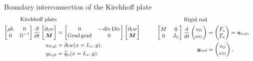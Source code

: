 \documentclass[aspectratio=169]{ISAE-Beamer}
\DeclareMathOperator*{\grad}{grad}
\DeclareMathOperator*{\Grad}{Grad}
\DeclareMathOperator*{\Div}{Div}
\renewcommand{\div}{\operatorname{div}}
\begin{document}
\begin{frame}{Boundary interconnection of the Kirchhoff plate}
\begin{equation*}\small
\begin{aligned}
\text{Kirchhoff plate} \\
\begin{bmatrix}
\rho h & 0 \\ 0 & \mathbb{D}^{-1} \\
\end{bmatrix}
\diffp{}{t}
\begin{bmatrix}
\partial_t w \\ \bm{M} \\
\end{bmatrix} &= 
\begin{bmatrix}
0 & -\div\Div \\ \Grad\grad & 0 \\
\end{bmatrix}
\begin{bmatrix}
\partial_t w \\ \bm{M} \\
\end{bmatrix} \\
u_{\partial, \text{pl}} &= \partial_t w (x = L_x, y), \\
y_{\partial, \text{pl}} &= \widetilde{q}_n(x = L_x, y).
\end{aligned} \qquad 
\begin{aligned}
\text{Rigid rod} \\
\begin{bmatrix}
M & 0 \\
0   & J_G \\
\end{bmatrix} 
\displaystyle \diff{}{t}
\begin{pmatrix}
v_G \\ \omega_G \\
\end{pmatrix} & = \begin{pmatrix}
F_z \\ T_x \\
\end{pmatrix} = \bm{u}_{\text{rod}}\vspace{1mm}, \\
\bm{y}_{\text{rod}} &= \begin{pmatrix}
v_G \\ \omega_{G} \\
\end{pmatrix},
\end{aligned}

\end{equation*}
\end{frame}
\end{document}
